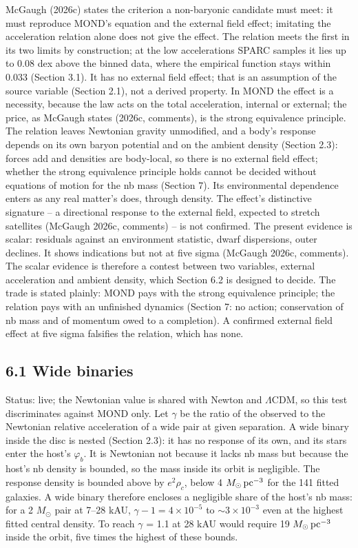 \documentclass[
  10pt,
]{article}
\begin{document}
McGaugh (2026c) states the criterion a non-baryonic candidate must meet: it must reproduce MOND's equation and the external field effect; imitating the acceleration relation alone does not give the effect. The relation meets the first in its two limits by construction; at the low accelerations SPARC samples it lies up to 0.08 dex above the binned data, where the empirical function stays within 0.033 (Section 3.1). It has no external field effect; that is an assumption of the source variable (Section 2.1), not a derived property. In MOND the effect is a necessity, because the law acts on the total acceleration, internal or external; the price, as McGaugh states (2026c, comments), is the strong equivalence principle. The relation leaves Newtonian gravity unmodified, and a body's response depends on its own baryon potential and on the ambient density (Section 2.3): forces add and densities are body-local, so there is no external field effect; whether the strong equivalence principle holds cannot be decided without equations of motion for the nb mass (Section 7). Its environmental dependence enters as any real matter's does, through density. The effect's distinctive signature -- a directional response to the external field, expected to stretch satellites (McGaugh 2026c, comments) -- is not confirmed. The present evidence is scalar: residuals against an environment statistic, dwarf dispersions, outer declines. It shows indications but not at five sigma (McGaugh 2026c, comments). The scalar evidence is therefore a contest between two variables, external acceleration and ambient density, which Section 6.2 is designed to decide. The trade is stated plainly: MOND pays with the strong equivalence principle; the relation pays with an unfinished dynamics (Section 7: no action; conservation of nb mass and of momentum owed to a completion). A confirmed external field effect at five sigma falsifies the relation, which has none.

\subsection{6.1 Wide binaries}

Status: live; the Newtonian value is shared with Newton and $\Lambda$CDM, so this test discriminates against MOND only. Let $\gamma$ be the ratio of the observed to the Newtonian relative acceleration of a wide pair at given separation. A wide binary inside the disc is nested (Section 2.3): it has no response of its own, and its stars enter the host's $\varphi_b$. It is Newtonian not because it lacks nb mass but because the host's nb density is bounded, so the mass inside its orbit is negligible. The response density is bounded above by $e^2\rho_c$, below 4 $M_\odot\,{\rm pc}^{-3}$ for the 141 fitted galaxies. A wide binary therefore encloses a negligible share of the host's nb mass: for a 2 $M_\odot$ pair at 7--28 kAU, $\gamma-1=4\times10^{-5}$ to $\sim3\times10^{-3}$ even at the highest fitted central density. To reach $\gamma$ = 1.1 at 28 kAU would require 19 $M_\odot\,{\rm pc}^{-3}$ inside the orbit, five times the highest of these bounds.
\end{document}
